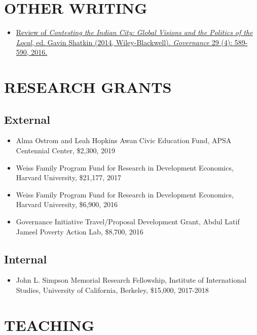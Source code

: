 \documentclass[11pt]{article}
\begin{document}
\section*{OTHER WRITING}
\begin{itemize}
\item[] \href{http://onlinelibrary.wiley.com/doi/10.1111/gove.12241/abstract}{Review of \textit{Contesting the Indian City: Global Visions and the Politics of the Local}, ed. Gavin Shatkin (2014, Wiley-Blackwell). \textit{Governance} 29 (4): 589-590, 2016.} \
\end{itemize}


\vspace{3mm}
\section*{RESEARCH GRANTS}
\subsection*{External}
\begin{itemize}
\item[]Alma Ostrom and Leah Hopkins Awan Civic Education Fund, APSA Centennial Center, \$2,300, 2019

\item[] Weiss Family Program Fund for Research in Development Economics, Harvard University, \$21,177, 2017
\item[] Weiss Family Program Fund for Research in Development Economics, Harvard University, \$6,900, 2016
\item[] Governance Initiative Travel/Proposal Development Grant, Abdul Latif Jameel Poverty Action Lab, \$8,700, 2016	
	 
\end{itemize}

\subsection*{Internal}
\begin{itemize}
\item[]John L. Simpson Memorial Research Fellowship, Institute of International Studies, University of California, Berkeley, \$15,000, 2017-2018
\end{itemize}


\vspace{3mm}
\section*{TEACHING}
\end{document}
